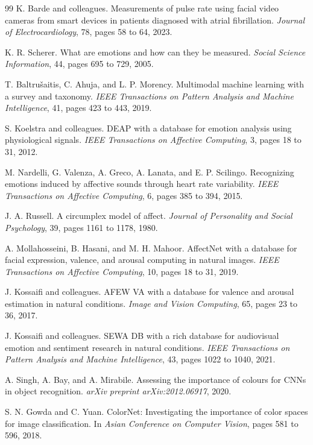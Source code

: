 \documentclass[12pt]{article}
\begin{document}
\begin{thebibliography}{99}
K. Barde and colleagues.
Measurements of pulse rate using facial video cameras from smart devices in patients diagnosed with atrial fibrillation.
\textit{Journal of Electrocardiology}, 78, pages 58 to 64, 2023.

K. R. Scherer.
What are emotions and how can they be measured.
\textit{Social Science Information}, 44, pages 695 to 729, 2005.

T. Baltru\v{s}aitis, C. Ahuja, and L. P. Morency.
Multimodal machine learning with a survey and taxonomy.
\textit{IEEE Transactions on Pattern Analysis and Machine Intelligence}, 41, pages 423 to 443, 2019.

S. Koelstra and colleagues.
DEAP with a database for emotion analysis using physiological signals.
\textit{IEEE Transactions on Affective Computing}, 3, pages 18 to 31, 2012.

M. Nardelli, G. Valenza, A. Greco, A. Lanata, and E. P. Scilingo.
Recognizing emotions induced by affective sounds through heart rate variability.
\textit{IEEE Transactions on Affective Computing}, 6, pages 385 to 394, 2015.

J. A. Russell.
A circumplex model of affect.
\textit{Journal of Personality and Social Psychology}, 39, pages 1161 to 1178, 1980.

A. Mollahosseini, B. Hasani, and M. H. Mahoor.
AffectNet with a database for facial expression, valence, and arousal computing in natural images.
\textit{IEEE Transactions on Affective Computing}, 10, pages 18 to 31, 2019.

J. Kossaifi and colleagues.
AFEW VA with a database for valence and arousal estimation in natural conditions.
\textit{Image and Vision Computing}, 65, pages 23 to 36, 2017.

J. Kossaifi and colleagues.
SEWA DB with a rich database for audiovisual emotion and sentiment research in natural conditions.
\textit{IEEE Transactions on Pattern Analysis and Machine Intelligence}, 43, pages 1022 to 1040, 2021.

A. Singh, A. Bay, and A. Mirabile.
Assessing the importance of colours for CNNs in object recognition.
\textit{arXiv preprint arXiv:2012.06917}, 2020.

S. N. Gowda and C. Yuan.
ColorNet: Investigating the importance of color spaces for image classification.
In \textit{Asian Conference on Computer Vision}, pages 581 to 596, 2018.


\end{thebibliography}
\end{document}

